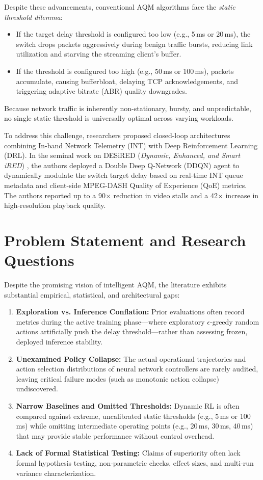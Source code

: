 \documentclass[12pt,a4paper,oneside]{report}
\begin{document}
Despite these advancements, conventional AQM algorithms face the \emph{static threshold dilemma}:
\begin{itemize}
  \item If the target delay threshold is configured too low (e.g., 5\,ms or 20\,ms), the switch drops packets aggressively during benign traffic bursts, reducing link utilization and starving the streaming client's buffer.
  \item If the threshold is configured too high (e.g., 50\,ms or 100\,ms), packets accumulate, causing bufferbloat, delaying TCP acknowledgements, and triggering adaptive bitrate (ABR) quality downgrades.
\end{itemize}
Because network traffic is inherently non-stationary, bursty, and unpredictable, no single static threshold is universally optimal across varying workloads.

To address this challenge, researchers proposed closed-loop architectures combining In-band Network Telemetry (INT) \cite{kim2015int} with Deep Reinforcement Learning (DRL). In the seminal work on DESiRED (\emph{Dynamic, Enhanced, and Smart iRED}) \cite{almeida2023desired}, the authors deployed a Double Deep Q-Network (DDQN) agent to dynamically modulate the switch target delay based on real-time INT queue metadata and client-side MPEG-DASH Quality of Experience (QoE) metrics. The authors reported up to a 90$\times$ reduction in video stalls and a 42$\times$ increase in high-resolution playback quality.

\section{Problem Statement and Research Questions}
Despite the promising vision of intelligent AQM, the literature exhibits substantial empirical, statistical, and architectural gaps:
\begin{enumerate}[label=\arabic*.]
  \item \textbf{Exploration vs. Inference Conflation:} Prior evaluations often record metrics during the active training phase—where exploratory $\epsilon$-greedy random actions artificially push the delay threshold—rather than assessing frozen, deployed inference stability.
  \item \textbf{Unexamined Policy Collapse:} The actual operational trajectories and action selection distributions of neural network controllers are rarely audited, leaving critical failure modes (such as monotonic action collapse) undiscovered.
  \item \textbf{Narrow Baselines and Omitted Thresholds:} Dynamic RL is often compared against extreme, uncalibrated static thresholds (e.g., 5\,ms or 100\,ms) while omitting intermediate operating points (e.g., 20\,ms, 30\,ms, 40\,ms) that may provide stable performance without control overhead.
  \item \textbf{Lack of Formal Statistical Testing:} Claims of superiority often lack formal hypothesis testing, non-parametric checks, effect sizes, and multi-run variance characterization.
\end{enumerate}
\end{document}
